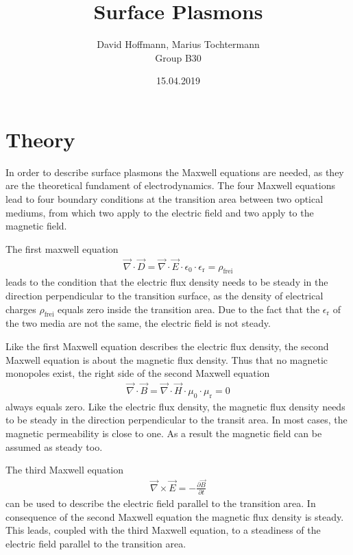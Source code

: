 \documentclass[twoside,english,headsepline=on,DIV=11]{scrartcl}
\numberwithin{equation}{section}
\begin{document}
\titlehead{{\Large Universität Stuttgart
\hfill SS 19\\}
Physikalisches Praktikum II}
\subject{Laboratory Report}
\title{Surface Plasmons}
\author{David Hoffmann, Marius Tochtermann \\
Group B30}
\publishers{}
\date{15.04.2019}
\maketitle
\begin{abstract}
\end{abstract}
\tableofcontents
\newpage
\section{Theory}
In order to describe surface plasmons the Maxwell equations are needed, as they are the theoretical fundament of electrodynamics. The four Maxwell equations lead to four boundary conditions at the transition area between two optical mediums, from which two apply to the electric field and two apply to the magnetic field. 

The first maxwell equation
\begin{align}
\vec{\nabla} \cdot \vec{D} = \vec{\nabla} \cdot \vec{E}\cdot \epsilon_0 \cdot \epsilon_\text{r} =  \rho_\text{frei} \label{eq:Maxwell1}
\end{align}
leads to the condition that the electric flux density needs to be steady in the direction perpendicular to the transition surface, as the density of electrical charges $\rho_\text{frei}$ equals zero inside the transition area. Due to the fact that the $\epsilon_\text{r}$ of the two media are not the same, the electric field is not steady.

Like the first Maxwell equation describes the electric flux density, the second Maxwell equation is about the magnetic flux density. Thus that no magnetic monopoles exist, the right side of the second Maxwell equation
\begin{align}
\vec{\nabla} \cdot \vec{B} = \vec{\nabla} \cdot \vec{H}\cdot \mu_0 \cdot \mu_\text{r} =  0 \label{eq:Maxwell2}
\end{align}
always equals zero. Like the electric flux density, the magnetic flux density needs to be steady in the direction perpendicular to the transit area. In most cases, the magnetic permeability is close to one. As a result the magnetic field can be assumed as steady too.

The third Maxwell equation 
\begin{align}
\vec{\nabla} \times \vec{E} = -\frac{\partial \vec{B}}{\partial t} \label{eq:Maxwell3}
\end{align}
can be used to describe the electric field parallel to the transition area. In consequence of the second Maxwell equation the magnetic flux density is steady. This leads, coupled with the third Maxwell equation, to a steadiness of the electric field parallel to the transition area.
\end{document}

